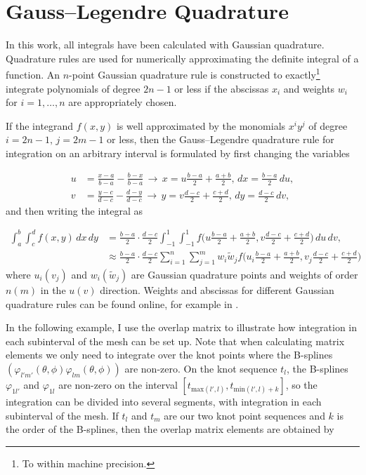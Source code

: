 \section{Gauss--Legendre Quadrature}
In this work, all integrals have been calculated with Gaussian quadrature. Quadrature rules are used for numerically approximating the definite integral of a function. An $n$-point Gaussian quadrature rule is constructed to exactly\footnote{To within machine precision.} integrate polynomials of degree $2n-1$ or less if the abscissas $x_i$ and weights $w_i$ for $i=1,\ldots,n$ are appropriately chosen. 

If the integrand $f(x,y)$ is well approximated by the monomials $x^{i}y^{j}$ of degree $i = 2n-1, \, j = 2m-1$ or less, then the Gauss--Legendre quadrature rule for integration on an arbitrary interval is formulated by first changing the variables

\begin{equation}
\begin{aligned}
u &= \frac{x-a}{b-a} - \frac{b-x}{b-a} \, \rightarrow \, x= u\frac{b-a}{2}+\frac{a+b}{2}, \,dx=\frac{b-a}{2}\,du, \\
v &= \frac{y-c}{d-c} - \frac{d-y}{d-c} \, \rightarrow \, y= v\frac{d-c}{2}+\frac{c+d}{2}, \,dy=\frac{d-c}{2}\,dv,
\end{aligned}
\end{equation} 
and then writing the integral as

\begin{equation}
\begin{aligned}
\int_{a}^{b} \int_{c}^{d}f(x,y) \,dx\,dy &= \frac{b-a}{2} \cdot \frac{d-c}{2} \int_{-1}^{1} \int_{-1}^{1}f \bigg( u\frac{b-a}{2} + \frac{a+b}{2},v\frac{d-c}{2} + \frac{c+d}{2} \bigg) \,du\,dv,\\
&\approx \frac{b-a}{2} \cdot \frac{d-c}{2} \sum_{i=1}^{n}\sum_{j=1}^{m}w_i \tilde{w}_j f\bigg( u_i\frac{b-a}{2} + \frac{a+b}{2},v_j\frac{d-c}{2} + \frac{c+d}{2}\bigg)
\end{aligned}
\end{equation}
where $u_i (v_j)$ and $w_i (\tilde{w}_j)$ are Gaussian quadrature points and weights of order $n (m)$ in the $u (v)$ direction. Weights and abscissas for different Gaussian quadrature rules can be found online, for example in \cite{NumericalRecipes}.

In the following example, I use the overlap matrix to illustrate how integration in each subinterval of the mesh can be set up. Note that when calculating matrix elements we only need to integrate over the knot points where the B-splines $(\varphi_{l'm'}(\theta,\phi)\varphi_{lm}(\theta,\phi))$ are non-zero. On the knot sequence $t_{l}$, the B-splines $\varphi_{1l'}$ and $\varphi_{1l}$ are non-zero on the interval $[t_{\text{max}(l',l)},t_{\text{min}(l',l)+k}]$, so the integration can be divided into several segments, with integration in each subinterval of the mesh. If $t_{l}$ and $t_{m}$ are our two knot point sequences and $k$ is the order of the B-splines, then the overlap matrix elements are obtained by

